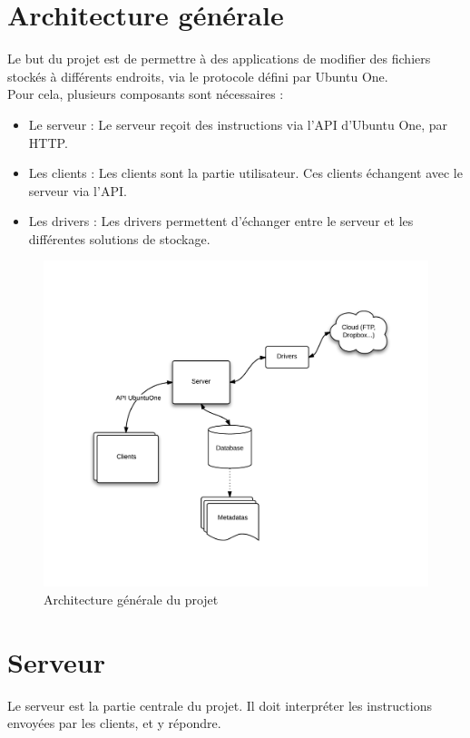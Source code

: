\section{Architecture générale}
Le but du projet est de permettre à des applications de modifier des fichiers stockés à différents endroits, via le protocole défini par Ubuntu One.\\

Pour cela, plusieurs composants sont nécessaires :
\begin{itemize}
\renewcommand{\labelitemi}{$\bullet$}
   \item Le serveur : Le serveur reçoit des instructions via l'API d'Ubuntu One, par HTTP.
   \item Les clients : Les clients sont la partie utilisateur. Ces clients échangent avec le serveur via l'API. 
   \item Les drivers : Les drivers permettent d'échanger entre le serveur et les différentes solutions de stockage. 
\end{itemize}

\begin{figure}
    \center
    \includegraphics[width=500pt]{architecture.png}
    \caption{Architecture générale du projet}
\end{figure}

\section{Serveur}
Le serveur est la partie centrale du projet. Il doit interpréter les instructions envoyées par les clients, et y répondre.\\

